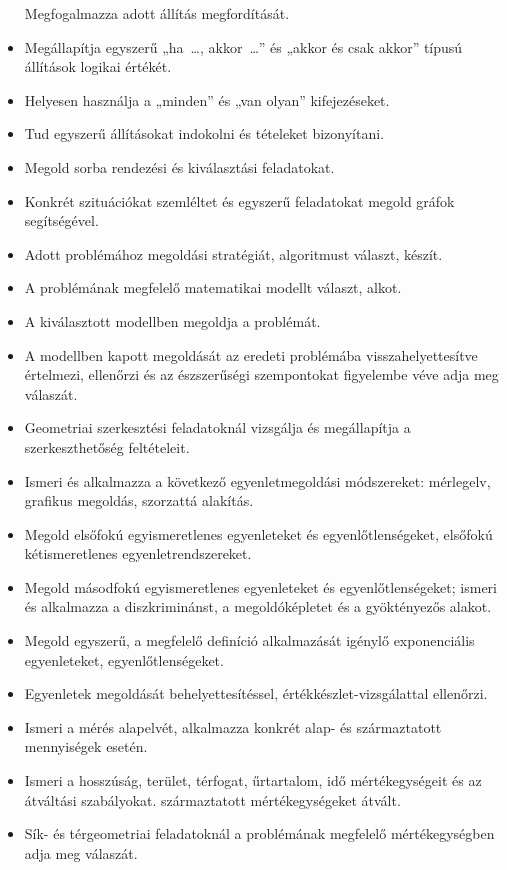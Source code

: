 \begin{itemize}
  Megfogalmazza adott állítás megfordítását.
\item
  Megállapítja egyszerű „ha~\dots, akkor~\dots'' és „akkor és csak akkor''
  típusú állítások logikai értékét.
\item
  Helyesen használja a „minden'' és „van olyan'' kifejezéseket.
\item
  Tud egyszerű állításokat indokolni és tételeket bizonyítani.
\item
  Megold sorba rendezési és kiválasztási feladatokat.
\item
  Konkrét szituációkat szemléltet és egyszerű feladatokat megold gráfok
  segítségével.
\item
  Adott problémához megoldási stratégiát, algoritmust választ, készít.
\item
  A problémának megfelelő matematikai modellt választ, alkot.
\item
  A kiválasztott modellben megoldja a problémát.
\item
  A modellben kapott megoldását az eredeti problémába
  visszahelyettesítve értelmezi, ellenőrzi és az észszerűségi
  szempontokat figyelembe véve adja meg válaszát.
\item
  Geometriai szerkesztési feladatoknál vizsgálja és megállapítja a
  szerkeszthetőség feltételeit.
\item
  Ismeri és alkalmazza a következő egyenletmegoldási módszereket:
  mérlegelv, grafikus megoldás, szorzattá alakítás.
\item
  Megold elsőfokú egyismeretlenes egyenleteket és egyenlőtlenségeket,
  elsőfokú kétismeretlenes egyenletrendszereket.
\item
  Megold másodfokú egyismeretlenes egyenleteket és egyenlőtlenségeket;
  ismeri és alkalmazza a diszkriminánst, a megoldóképletet és a
  gyöktényezős alakot.
\item
  Megold egyszerű, a megfelelő definíció alkalmazását igénylő
  exponenciális egyenleteket, egyenlőtlenségeket.
\item
  Egyenletek megoldását behelyettesítéssel, értékkészlet-vizsgálattal
  ellenőrzi.
\item
  Ismeri a mérés alapelvét, alkalmazza konkrét alap- és származtatott
  mennyiségek esetén.
\item
  Ismeri a hosszúság, terület, térfogat, űrtartalom, idő mértékegységeit
  és az átváltási szabályokat. származtatott mértékegységeket átvált.
\item
  Sík- és térgeometriai feladatoknál a problémának megfelelő
  mértékegységben adja meg válaszát.

\end{itemize}
